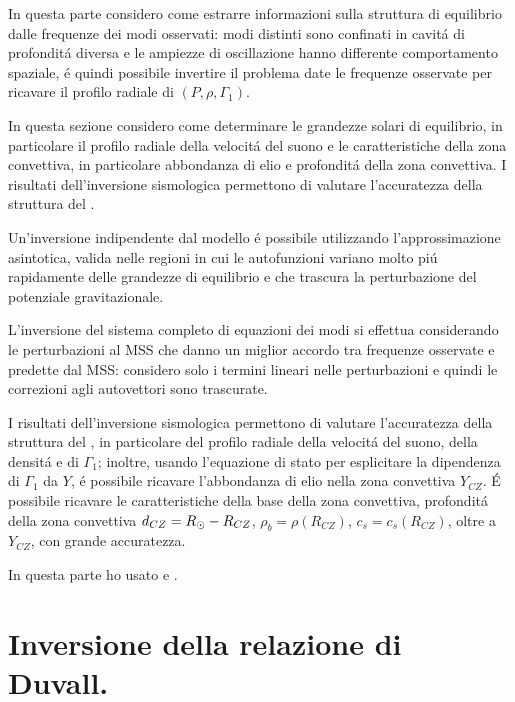 \documentclass[../main.tex]{subfiles}
\begin{document}
\begin{errata}
In questa parte considero come estrarre informazioni sulla struttura di equilibrio dalle frequenze dei modi osservati: modi distinti sono confinati in cavit\'a di profondit\'a diversa e le ampiezze di oscillazione hanno differente comportamento spaziale, \'e quindi possibile invertire il problema date le frequenze osservate per ricavare il profilo radiale di $(P,\rho,\Gamma_1)$.
\end{errata}

In questa sezione considero come determinare le grandezze solari di equilibrio, in particolare il profilo radiale della velocit\'a del suono e le caratteristiche della zona convettiva, in particolare abbondanza di elio e profondit\'a della zona convettiva. I risultati dell'inversione sismologica permettono di valutare l'accuratezza della struttura del \mss{}.

Un'inversione indipendente dal modello \'e possibile utilizzando l'approssimazione asintotica, valida nelle regioni in cui le autofunzioni variano molto pi\'u rapidamente delle grandezze di equilibrio e che trascura la perturbazione del potenziale gravitazionale.
 
L'inversione del sistema completo di equazioni dei modi si effettua considerando le perturbazioni al MSS che danno un miglior accordo tra frequenze osservate e predette dal MSS: considero solo i termini lineari nelle perturbazioni e quindi le correzioni agli autovettori sono trascurate.

\begin{errata}
I risultati dell'inversione sismologica permettono di valutare l'accuratezza della struttura del \mss{}, in particolare del profilo radiale della velocit\'a del suono, della densit\'a e di $\Gamma_1$; inoltre, usando l'equazione di stato per esplicitare la dipendenza di $\Gamma_1$ da $Y$, \'e possibile ricavare l'abbondanza di elio nella zona convettiva $Y_{CZ}$.
\'E possibile ricavare le caratteristiche della base della zona convettiva, profondit\'a della zona convettiva $d_{CZ}=R_{\odot}{}-R_{CZ}$, $\rho_b=\rho(R_{CZ})$, $c_s=c_s(R_{CZ})$, oltre a $Y_{CZ}$, con grande accuratezza.
\end{errata}

In questa parte ho usato \cite{dal03notes} e \cite{chr02helioseismology}.

{\let\clearpage\relax\let\cleardoublepage\relax \chapter{Inversione della relazione di Duvall.}} %
\end{document}

